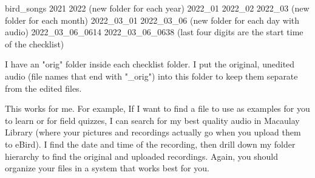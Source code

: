\documentclass[12pt]{article}
\begin{document}
bird\_songs\newline
\hspace*{1em}2021\newline
\hspace*{1em}2022 (new folder for each year)\newline
\hspace*{2em}2022\_01\newline
\hspace*{2em}2022\_02\newline
\hspace*{2em}2022\_03 (new folder for each month)\newline
\hspace*{3em}2022\_03\_01\newline
\hspace*{3em}2022\_03\_06 (new folder for each day with audio)\newline
\hspace*{4em}2022\_03\_06\_0614\newline
\hspace*{4em}2022\_03\_06\_0638 (last four digits are the start time of the checklist)
        
I have an "orig" folder inside each checklist folder. I put the original, unedited audio (file names that end with "\_orig") into this folder to keep them separate from the edited files.

This works for me. For example, If I want to find a file to use as examples for you to learn or for field quizzes, I can search for my best quality audio in Macaulay Library (where your pictures and recordings actually go when you upload them to eBird). I find the date and time of the recording, then drill down my folder hierarchy to find the original and uploaded recordings. Again, you should organize your files in a system that works best for you.
\end{document}
